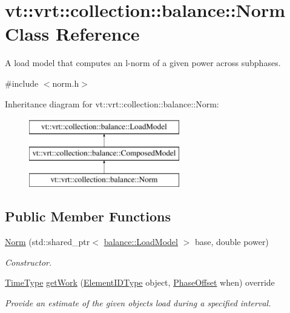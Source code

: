 \hypertarget{classvt_1_1vrt_1_1collection_1_1balance_1_1_norm}{}\section{vt\+:\+:vrt\+:\+:collection\+:\+:balance\+:\+:Norm Class Reference}
\label{classvt_1_1vrt_1_1collection_1_1balance_1_1_norm}


A load model that computes an l-\/norm of a given power across subphases.  




{\ttfamily \#include $<$norm.\+h$>$}

Inheritance diagram for vt\+:\+:vrt\+:\+:collection\+:\+:balance\+:\+:Norm\+:\begin{figure}[H]
\begin{center}
\leavevmode
\includegraphics[height=3.000000cm]{classvt_1_1vrt_1_1collection_1_1balance_1_1_norm}
\end{center}
\end{figure}
\subsection*{Public Member Functions}
\begin{DoxyCompactItemize}
\item 
\hyperlink{classvt_1_1vrt_1_1collection_1_1balance_1_1_norm_a054625ebe2a8dcd9f986f36f40b70ada}{Norm} (std\+::shared\+\_\+ptr$<$ \hyperlink{classvt_1_1vrt_1_1collection_1_1balance_1_1_load_model}{balance\+::\+Load\+Model} $>$ base, double power)
\begin{DoxyCompactList}\small\item\em Constructor. \end{DoxyCompactList}\item 
\hyperlink{namespacevt_a876a9d0cd5a952859c72de8a46881442}{Time\+Type} \hyperlink{classvt_1_1vrt_1_1collection_1_1balance_1_1_norm_a377ea9ef65f621d12db2030414a2deda}{get\+Work} (\hyperlink{namespacevt_1_1vrt_1_1collection_1_1balance_a14c8d2c972f2913aa3f1636e5be0a120}{Element\+I\+D\+Type} object, \hyperlink{structvt_1_1vrt_1_1collection_1_1balance_1_1_phase_offset}{Phase\+Offset} when) override
\begin{DoxyCompactList}\small\item\em Provide an estimate of the given object\textquotesingle{}s load during a specified interval. \end{DoxyCompactList}\end{DoxyCompactItemize}
